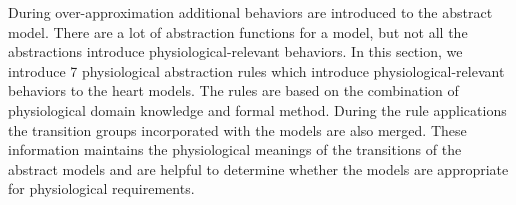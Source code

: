 \label{ruleBasedHeartModelAbstraction}
During over-approximation additional behaviors are introduced to the abstract model. There are a lot of abstraction functions for a model, but not all the abstractions introduce physiological-relevant behaviors. In this section, we introduce 7 physiological abstraction rules which introduce physiological-relevant behaviors to the heart models. The rules are based on the combination of physiological domain knowledge and formal method. During the rule applications the transition groups incorporated with the models are also merged. These information maintains the physiological meanings of the transitions of the abstract models and are helpful to determine whether the models are appropriate for physiological requirements.%

